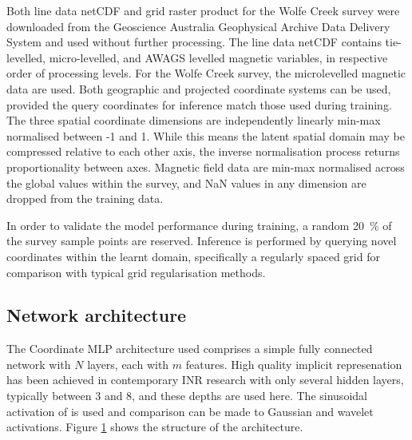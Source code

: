 \documentclass[manuscript.tex]{subfiles}
\begin{document}
Both line data netCDF and grid raster product for the Wolfe Creek survey were downloaded from the Geoscience Australia Geophysical Archive Data Delivery System and used without further processing.
The line data netCDF contains tie-levelled, micro-levelled, and AWAGS levelled magnetic variables, in respective order of processing levels.
For the Wolfe Creek survey, the microlevelled magnetic data are used.
Both geographic and projected coordinate systems can be used, provided the query coordinates for inference match those used during training.
The three spatial coordinate dimensions are independently linearly min-max normalised between -1 and 1.
While this means the latent spatial domain may be compressed relative to each other axis, the inverse normalisation process returns proportionality between axes.
Magnetic field data are min-max normalised across the global values within the survey, and NaN values in any dimension are dropped from the training data.

In order to validate the model performance during training, a random \qty{20}{\percent} of the survey sample points are reserved.
Inference is performed by querying novel coordinates within the learnt domain, specifically a regularly spaced grid for comparison with typical grid regularisation methods.

\subsection{Network architecture}
The Coordinate MLP architecture used comprises a simple fully connected network with \(N\) layers, each with \(m\) features.
High quality implicit represenation has been achieved in contemporary INR research with only several hidden layers, typically between 3 and 8, and these depths are used here.
The sinusoidal activation of \parencite{sitzmann2019siren} is used and comparison can be made to Gaussian and wavelet activations.
Figure \cref{fig:arch} shows the structure of the architecture.

\begin{figure}
    \label{fig:arch}
\end{figure}
\end{document}
